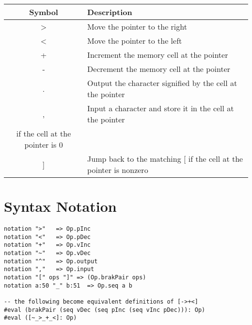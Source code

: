 \documentclass[runningheads]{llncs}
\begin{document}
\begin{table}[h]
    \centering
    \begin{tabular}{|c|l|}
        \hline
        \textbf{Symbol} & \textbf{Description} \\
        \hline
        \textgreater & Move the pointer to the right \\
        \hline
        \textless & Move the pointer to the left \\
        \hline
        + & Increment the memory cell at the pointer \\
        \hline
        - & Decrement the memory cell at the pointer \\
        \hline
        . & Output the character signified by the cell at the pointer \\
        \hline
        , & Input a character and store it in the cell at the pointer \\
        \hline
        [ & Jump past the matching ] if the cell at the pointer is 0 \\
        \hline
        ] & Jump back to the matching [ if the cell at the pointer is nonzero
        \\
        \hline
    \end{tabular}
\end{table}

\section{Syntax Notation}
\label{ap:notations}

\begin{lstlisting}[caption=Notations used for the defined operations. The goal
    of this is to simplify program declaration]
notation ">"   => Op.pInc
notation "<"   => Op.pDec
notation "+"   => Op.vInc
notation "~"   => Op.vDec
notation "^"   => Op.output
notation ","   => Op.input
notation "[" ops "]" => (Op.brakPair ops)
notation a:50 "_" b:51  => Op.seq a b

-- the following become equivalent definitions of [->+<]
#eval (brakPair (seq vDec (seq pInc (seq vInc pDec))): Op)
#eval ([~_>_+_<]: Op)
\end{lstlisting}
\end{document}
